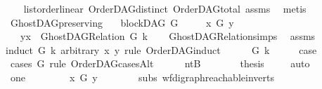\begin{isabellebody}
\ \ \isamarkupfalse%
\ list{\isacharunderscore}{\kern0pt}order{\isacharunderscore}{\kern0pt}linear\ OrderDAG{\isacharunderscore}{\kern0pt}distinct\ OrderDAG{\isacharunderscore}{\kern0pt}total\ assms\ \isamarkupfalse%
\ metis%
\endisatagproof
{\isafoldproof}%
%
\isadelimproof
\isanewline
%
\endisadelimproof
\isanewline
{}\isamarkupfalse%
\ GhostDAG{\isacharunderscore}{\kern0pt}preserving{\isacharcolon}{\kern0pt}\isanewline
\ \ \ {\isachardoublequoteopen}blockDAG\ G{\isachardoublequoteclose}\isanewline
\ \ \ \ \ {\isachardoublequoteopen}x\ {\isasymrightarrow}\isactrlsup {\isacharplus}{\kern0pt}\isactrlbsub G\isactrlesub \ y{\isachardoublequoteclose}\isanewline
\ \ \ {\isachardoublequoteopen}{\isacharparenleft}{\kern0pt}y{\isacharcomma}{\kern0pt}x{\isacharparenright}{\kern0pt}\ {\isasymin}\ GhostDAG{\isacharunderscore}{\kern0pt}Relation\ G\ k{\isachardoublequoteclose}\isanewline
%
\isadelimproof
\ \ %
\endisadelimproof
%
\isatagproof
{}\isamarkupfalse%
\ GhostDAG{\isacharunderscore}{\kern0pt}Relation{\isachardot}{\kern0pt}simps\ \isamarkupfalse%
\ assms\ \isanewline
{}\isamarkupfalse%
{\isacharparenleft}{\kern0pt}induct\ G\ k\ arbitrary{\isacharcolon}{\kern0pt}\ x\ y\ rule{\isacharcolon}{\kern0pt}\ OrderDAG{\isachardot}{\kern0pt}induct\ {\isacharparenright}{\kern0pt}\isanewline
\ \ \isamarkupfalse%
\ {\isacharparenleft}{\kern0pt}{}\ G\ k{\isacharparenright}{\kern0pt}\isanewline
\ \ \isamarkupfalse%
\ \isamarkupfalse%
\ {\isacharquery}{\kern0pt}case\ \isamarkupfalse%
\ {\isacharparenleft}{\kern0pt}cases\ G\ rule{\isacharcolon}{\kern0pt}\ OrderDAG{\isacharunderscore}{\kern0pt}casesAlt{\isacharparenright}{\kern0pt}\isanewline
\ \ \ \ \isamarkupfalse%
\ ntB\isanewline
\ \ \ \ \isamarkupfalse%
\ \isamarkupfalse%
\ {\isacharquery}{\kern0pt}thesis\ \isamarkupfalse%
\ {}\ \isamarkupfalse%
\ auto\isanewline
\ \ \isamarkupfalse%
\isanewline
\ \ \ \ \isamarkupfalse%
\ one\isanewline
\ \ \ \ \isamarkupfalse%
\ \isamarkupfalse%
\ {\isachardoublequoteopen}{\isasymnot}\ x\ {\isasymrightarrow}\isactrlsup {\isacharplus}{\kern0pt}\isactrlbsub G\isactrlesub \ y{\isachardoublequoteclose}\isanewline
\ \ \ \ \ \ \isamarkupfalse%
\ subs\ wf{\isacharunderscore}{\kern0pt}digraph{\isachardot}{\kern0pt}reachable{}{\isacharunderscore}{\kern0pt}in{\isacharunderscore}{\kern0pt}verts\ {}\isanewline

\end{isabellebody}
